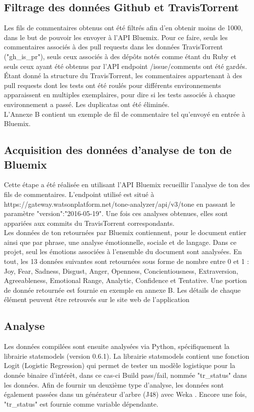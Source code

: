 \documentclass[10pt, conference]{IEEEtran}
\begin{document}
\subsection{Filtrage des données Github et TravisTorrent}
Les fils de commentaires obtenus ont été filtrés afin d’en obtenir moins de 1000, dans le but de pouvoir les envoyer à l’API Bluemix. Pour ce faire, seuls les commentaires associés à des pull requests dans les données TravisTorrent ("gh\_is\_pr"), seuls ceux associés à des dépôts notés comme étant du Ruby et seuls ceux ayant été obtenus par l’API endpoint /issue/comments ont été gardés. Étant donné la structure du TravisTorrent, les commentaires appartenant à des pull requests dont les tests ont été roulés pour différents environnements apparaissent en multiples exemplaires, pour dire si les tests associés à chaque environnement a passé. Les duplicatas ont été éliminés. \\
L’Annexe B contient un exemple de fil de commentaire tel qu’envoyé en entrée à Bluemix.

\subsection{Acquisition des données d’analyse de ton de Bluemix} 
Cette étape a été réalisée en utilisant l’API Bluemix recueillir l’analyse de ton des fils de commentaires. L’endpoint utilisé est situé à https://gateway.watsonplatform.net/tone-analyzer/api/v3/tone en passant le paramètre "version":"2016-05-19". Une fois ces analyses obtenues, elles sont appariées aux commits du TravisTorrent correspondants. \\
Les données de ton retournées par Bluemix contiennent, pour le document entier ainsi que par phrase, une analyse émotionnelle, sociale et de langage. Dans ce projet, seul les émotions associées à l'ensemble du document sont analysées. En tout, les 13 données suivantes sont retournées sous forme de nombre entre 0 et 1 : Joy, Fear, Sadness, Disgust, Anger, Openness, Concientiousness, Extraversion, Agreeableness, Emotional Range, Analytic, Confidence et Tentative. Une portion de donnée retournée est fournie en exemple en annexe B. Les détails de chaque élément peuvent être retrouvés sur le site web de l'application \cite{c1}

\subsection{Analyse}
Les données compilées sont ensuite analysées via Python, spécifiquement la librairie statsmodels (version 0.6.1). La librairie statsmodels contient une fonction Logit (Logistic Regression) qui permet de tester un modèle logistique pour la donnée binaire d’intérêt, dans ce cas-ci Build pass/fail, nommée "tr\_status" dans les données.
Afin de fournir un deuxième type d’analyse, les données sont également passées dans un générateur d’arbre (J48) avec Weka \cite{c5}. Encore une fois, "tr\_status" est fournie comme variable dépendante. 
\end{document}
